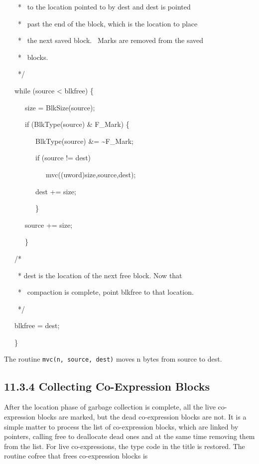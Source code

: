 {\ttfamily\mdseries
\ \ \ \ * \ to the location pointed to by dest and dest is pointed}

{\ttfamily\mdseries
\ \ \ \ * \ past the end of the block, which is the location to place}

{\ttfamily\mdseries
\ \ \ \ * \ the next saved block. \ Marks are removed from the saved}

{\ttfamily\mdseries
\ \ \ \ * \ blocks.}

{\ttfamily\mdseries
\ \ \ \ */
}

{\ttfamily\mdseries
\ \ \ while (source {\textless} blkfree) \{
}

{\ttfamily\mdseries
\ \ \ \ \ \ size = BlkSize(source);
}

{\ttfamily\mdseries
\ \ \ \ \ \ if (BlkType(source) \& F\_Mark) \{
}

{\ttfamily\mdseries
\ \ \ \ \ \ \ \ \ BlkType(source) \&= \~{}F\_Mark;
}

{\ttfamily\mdseries
\ \ \ \ \ \ \ \ \ if (source != dest)
}

{\ttfamily\mdseries
\ \ \ \ \ \ \ \ \ \ \ \ mvc((uword)size,source,dest);
}

{\ttfamily\mdseries
\ \ \ \ \ \ \ \ \ dest += size;
}

{\ttfamily\mdseries
\ \ \ \ \ \ \ \ \ \}
}

{\ttfamily\mdseries
\ \ \ \ \ \ source += size;
}

{\ttfamily\mdseries
\ \ \ \ \ \ \}
}


\bigskip

{\ttfamily\mdseries
\ \ \ /*
}

{\ttfamily\mdseries
\ \ \ \ * dest is the location of the next free block. Now that}

{\ttfamily\mdseries
\ \ \ \ * \ compaction is complete, point blkfree to that location.
}

{\ttfamily\mdseries
\ \ \ \ */
}

{\ttfamily\mdseries
\ \ \ blkfree = dest;
}

{\ttfamily\mdseries
\ \ \ \}}

The routine \texttt{mvc(n, source, dest)} moves n bytes from source to dest.

\subsection[11.3.4 Collecting Co-Expression Blocks]{11.3.4 Collecting Co-Expression Blocks}

After the location phase of garbage collection is complete, all the
live co-expression blocks are marked, but the dead co-expression
blocks are not. It is a simple matter to process the list of
co-expression blocks, which are linked by pointers, calling free to
deallocate dead ones and at the same time removing them from the
list. For live co-expressions, the type code in the title is
restored. The routine cofree that frees co-expression blocks is

